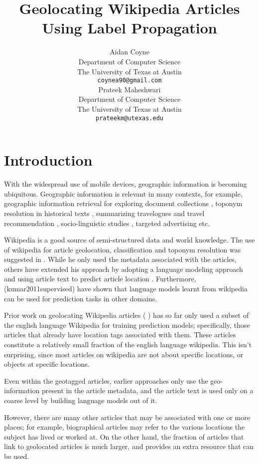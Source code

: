 \documentclass[11pt]{article}
\title{Geolocating Wikipedia Articles Using Label Propagation}
\author{
  Aidan Coyne \\
    Department of Computer Science\\
    The University of Texas at Austin\\
  {\tt coynea90@gmail.com} \\ 
  \And
  Prateek Maheshwari\\
    Department of Computer Science\\
    The University of Texas at Austin\\
  {\tt prateekm@utexas.edu}
}
\date{}
\newcommand{\comment}[1]{}
\begin{document}
\maketitle

\section{Introduction}
\comment{You can now enclose text in a comment block to comment it out inline}
With the widespread use of mobile devices, geographic information is becoming ubiquitous. Geographic information is relevant in many contexts, for example, 
geographic information retrieval for exploring document collections \cite{}, toponym resolution in historical texts \cite{perseus project},  summarizing travelogues and travel recommendation \cite{hao},
socio-linguistic studies \cite{eisenstien}, targeted advertising etc.

Wikipedia is a good source of semi-structured data and world knowledge. The use of wikipedia for article geolocation, classification and toponym resolution
 was suggested in \cite{Overall09}. While he only used the metadata associated with the articles, 
others have extended his approach by adopting a language modeling approach and using article text to predict article location \cite{wing-baldridge:11}. Furthermore,
(kumar2011supervised) have shown that language models learnt from wikipedia can be used for prediction tasks in other domains.

Prior work on geolocating Wikipedia articles (\cite{wing-baldridge:11} \cite{rolleretal:12}) has so far only used 
a subset of the english language Wikipedia for training prediction models;  specifically, those articles that already have location tags associated with them.  
These articles constitute a relatively small fraction of the english language wikipedia. \comment{find actual figure}
This isn't surprising, since most articles on wikipedia are not about specific locations, or objects at specific locations.

Even within the geotagged articles, earlier approaches only use the geo-information present in the article metadata, 
and the article text is used only on a coarse level by building language models out of it.

However, there are many other articles that may be associated with one or more places;  for example, biographical articles may refer to the various locations the subject has lived or worked at.
On the other hand, the fraction of articles that link to geolocated articles is much larger, and provides an extra resource that can be used. \comment{ find figure  of the wikipedia corpus}
\end{document}
